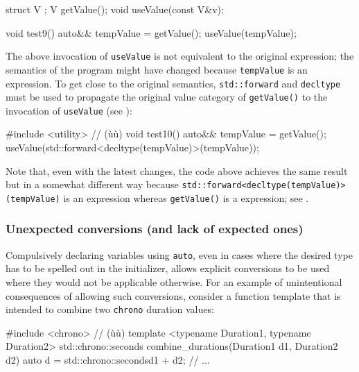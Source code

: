 \begin{emcppshiddenlisting}[emcppsbatch={e15,e16}]
struct V {};
V getValue();
void useValue(const V&v);
\end{emcppshiddenlisting}
\begin{emcppslisting}[emcppsbatch=e15]
void test9()
{
    auto&& tempValue = getValue();
    useValue(tempValue);
}
\end{emcppslisting}
    
\noindent The above invocation of \lstinline!useValue! is not equivalent to the
original expression; the semantics of the program might have changed because \lstinline!tempValue! is an  expression. To get
close to the original semantics, \lstinline!std::forward! and
\lstinline!decltype! must be used to propagate the original value category
of \lstinline!getValue()! to the invocation of \lstinline!useValue! (see
):

\begin{emcppslisting}[emcppsbatch=e16]
#include <utility>  // (ù{}ù)
void test10()
{
    auto&& tempValue = getValue();
    useValue(std::forward<decltype(tempValue)>(tempValue));
}
\end{emcppslisting}
    
\noindent Note that, even with the latest changes, the code above achieves the same result but in a somewhat different way because
 \lstinline!std::forward<decltype(tempValue)>(tempValue)! is
an  expression whereas \lstinline!getValue()! is a
 expression; see .

\subsubsection[Unexpected conversions (and lack of expected ones)]{Unexpected conversions (and lack of expected ones)}\label{unexpected-conversions-(and-lack-of-expected-ones)}

Compulsively declaring variables using \lstinline!auto!, even in cases
where the desired type has to be spelled out in the initializer, allows
explicit conversions to be used where they would not be applicable
otherwise. For an example of unintentional consequences of allowing such
conversions, consider a function template that is intended to combine
two \lstinline!chrono! duration values:

\begin{emcppslisting}
#include <chrono>  // (ù{}ù)
template <typename Duration1, typename Duration2>
std::chrono::seconds combine_durations(Duration1 d1, Duration2 d2)
{
    auto d = std::chrono::seconds{d1 + d2};
    // ...
}
\end{emcppslisting}
    
